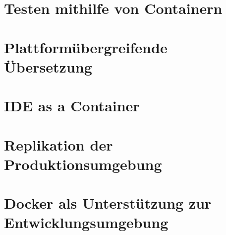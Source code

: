 \section{Testen mithilfe von Containern}
\label{sec:containerbasiertes-testen}
\section{Plattformübergreifende Übersetzung}
\label{sec:plattformuebergreifende-uebersetzung}
\section{IDE as a Container}
\label{sec:ideasacontainer}
\section{Replikation der Produktionsumgebung}
\label{sec:replikation-produktionsumgebung}
\section{Docker als Unterstützung zur Entwicklungsumgebung}
\label{sec:docker-assistance}


